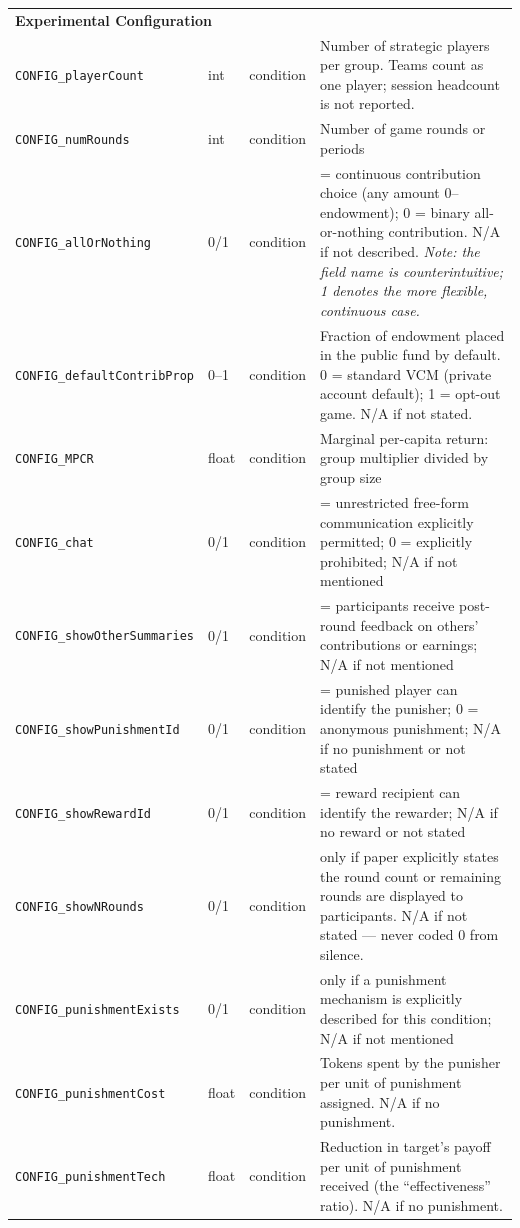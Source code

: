 \documentclass[11pt,a4paper]{article}
\begin{document}
\begin{longtable}{p{3.9cm} p{1.2cm} p{2.1cm} >{\raggedright\arraybackslash}p{6.4cm}}
\multicolumn{4}{l}{\textbf{Experimental Configuration}}\\[2pt]
\texttt{CONFIG\_playerCount} & int & condition & Number of strategic players per group. Teams count as one player; session headcount is not reported. \\
\texttt{CONFIG\_numRounds} & int & condition & Number of game rounds or periods \\
\texttt{CONFIG\_allOrNothing} & 0/1 & condition & 1 = continuous contribution choice (any amount 0–endowment); 0 = binary all-or-nothing contribution. N/A if not described. \textit{Note: the field name is counterintuitive; 1 denotes the more flexible, continuous case.} \\
\texttt{CONFIG\_defaultContribProp} & 0–1 & condition & Fraction of endowment placed in the public fund by default. 0 = standard VCM (private account default); 1 = opt-out game. N/A if not stated. \\
\texttt{CONFIG\_MPCR} & float & condition & Marginal per-capita return: group multiplier divided by group size \\
\texttt{CONFIG\_chat} & 0/1 & condition & 1 = unrestricted free-form communication explicitly permitted; 0 = explicitly prohibited; N/A if not mentioned \\
\texttt{CONFIG\_showOtherSummaries} & 0/1 & condition & 1 = participants receive post-round feedback on others' contributions or earnings; N/A if not mentioned \\
\texttt{CONFIG\_showPunishmentId} & 0/1 & condition & 1 = punished player can identify the punisher; 0 = anonymous punishment; N/A if no punishment or not stated \\
\texttt{CONFIG\_showRewardId} & 0/1 & condition & 1 = reward recipient can identify the rewarder; N/A if no reward or not stated \\
\texttt{CONFIG\_showNRounds} & 0/1 & condition & 1 only if paper explicitly states the round count or remaining rounds are displayed to participants. N/A if not stated — never coded 0 from silence. \\
\texttt{CONFIG\_punishmentExists} & 0/1 & condition & 1 only if a punishment mechanism is explicitly described for this condition; N/A if not mentioned \\
\texttt{CONFIG\_punishmentCost} & float & condition & Tokens spent by the punisher per unit of punishment assigned. N/A if no punishment. \\
\texttt{CONFIG\_punishmentTech} & float & condition & Reduction in target's payoff per unit of punishment received (the ``effectiveness'' ratio). N/A if no punishment. \\

\end{longtable}
\end{document}
